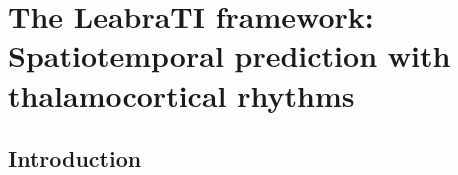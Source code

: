 \documentclass[dwyatte_dissertation.tex]{subfiles}
\begin{document}
\chapter{The LeabraTI framework: Spatiotemporal prediction with thalamocortical rhythms}
\label{chap:leabrati}

%
%
%


\section{Introduction}
%
\end{document}

